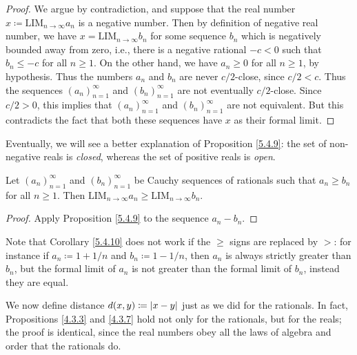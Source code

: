 \begin{proof}
We argue by contradiction, and suppose that the real number \(x \coloneqq \text{LIM}_{n \to \infty} a_n\) is a negative number.
Then by definition of negative real number, we have \(x = \text{LIM}_{n \to \infty} b_n\) for some sequence \(b_n\) which is negatively bounded away from zero, i.e., there is a negative rational \(-c < 0\) such that \(b_n \leq -c\) for all \(n \geq 1\).
On the other hand, we have \(a_n \geq 0\) for all \(n \geq 1\), by hypothesis.
Thus the numbers \(a_n\) and \(b_n\) are never \(c / 2\)-close, since \(c / 2 < c\).
Thus the sequences \((a_n)_{n = 1}^{\infty}\) and \((b_n)_{n = 1}^{\infty}\) are not eventually \(c / 2\)-close.
Since \(c / 2 > 0\), this implies that \((a_n)_{n = 1}^{\infty}\) and \((b_n)_{n = 1}^{\infty}\) are not equivalent.
But this contradicts the fact that both these sequences have \(x\) as their formal limit.
\end{proof}

\begin{note}
Eventually, we will see a better explanation of Proposition \ref{5.4.9}:
the set of non-negative reals is \emph{closed}, whereas the set of positive reals is \emph{open}.
\end{note}

\begin{corollary}\label{5.4.10}
Let \((a_n)_{n = 1}^{\infty}\) and \((b_n)_{n = 1}^{\infty}\) be Cauchy sequences of rationals such that \(a_n \geq b_n\) for all \(n \geq 1\).
Then \(\text{LIM}_{n \to \infty} a_n \geq \text{LIM}_{n \to \infty} b_n\).
\end{corollary}

\begin{proof}
Apply Proposition \ref{5.4.9} to the sequence \(a_n - b_n\).
\end{proof}

\begin{remark}\label{5.4.11}
Note that Corollary \ref{5.4.10} does not work if the \(\geq\) signs are replaced by \(>\):
for instance if \(a_n \coloneqq 1 + 1 / n\) and \(b_n \coloneqq 1 - 1 / n\), then \(a_n\) is always strictly greater than \(b_n\), but the formal limit of \(a_n\) is not greater than the formal limit of \(b_n\), instead they are equal.
\end{remark}

\begin{note}
We now define distance \(d(x, y) \coloneqq \abs*{x - y}\) just as we did for the rationals.
In fact, Propositions \ref{4.3.3} and \ref{4.3.7} hold not only for the rationals, but for the reals;
the proof is identical, since the real numbers obey all the laws of algebra and order that the rationals do.
\end{note}

